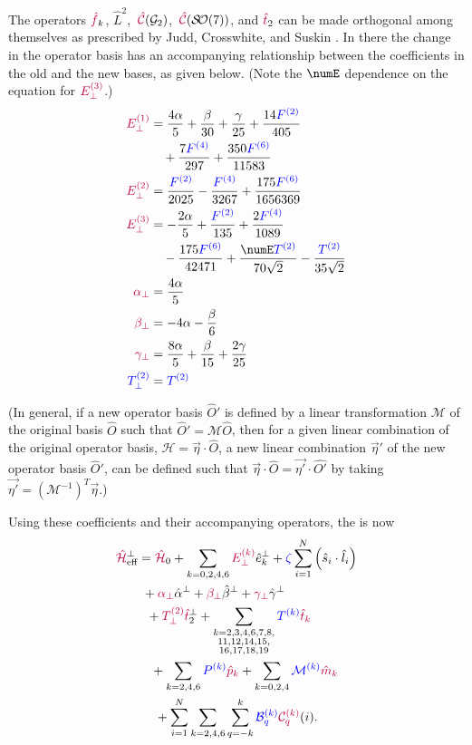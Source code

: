 \documentclass[11pt, twoside,openright]{article}
\begin{document}
The operators $\textcolor{purple}{\hat{f}}_k$, $\hat{L}^2$, ${\,\mathcal{\textcolor{purple}{\hat{C}}}}(\mathcal{G}_2) $, ${\,\mathcal{\textcolor{purple}{\hat{C}}}}(\mathcal{S\!O}(7))$, and $\textcolor{purple}{\hat{t}}_2$ can be made orthogonal among themselves as prescribed by Judd, Crosswhite, and Suskin \cite{judd_orthogonalized_1984,judd_complete_1984}. In there the change in the operator basis has an accompanying relationship between the coefficients in the old and the new bases, as given below. (Note the $\numE$ dependence on the equation for $\textcolor{purple}{{{E}^{(3)}_\perp}}$.) 
\begin{align}
    \OEk{1} &= \frac{4\alpha}{5}+\frac{\beta}{30}+\frac{\gamma}{25}+\frac{14\Fk{2}}{405} \notag \\
    &\quad +\frac{7\Fk{4}}{297} +\frac{350\Fk{6}}{11583} \\
    \OEk{2} &= \frac{\Fk{2}}{2025}-\frac{\Fk{4}}{3267}+\frac{175\Fk{6}}{1656369} \\
    \OEk{3} &= -\frac{2\alpha}{5}+\frac{\Fk{2}}{135}+\frac{2\Fk{4}}{1089} \notag \\
    & \quad -\frac{175\Fk{6}}{42471} +\frac{\numE\Tk{2}}{70\sqrt{2}}-\frac{\Tk{2}}{35\sqrt{2}} \\
    \OcasimirAlpha &= \frac{4\alpha}{5} \\
    \OcasimirBeta &= -4\alpha-\frac{\beta}{6} \\
    \OcasimirGamma &= \frac{8\alpha}{5}+\frac{\beta}{15}+\frac{2\gamma}{25} \\
    \OTk{2} & = \Tk{2} \label{eq: T2 prime}
\end{align}

(In general, if a new operator basis $\hat{O}'$ is defined by a linear transformation $\mathcal{M}$ of the original basis $\hat{O}$ such that $\hat{O}' = \mathcal{M} \hat{O}$, then for a given linear combination of the original operator basis, $\mathcal{H} = \vec{\eta} \cdot \hat{O}$, a new linear combination $\vec{\eta}'$ of the new operator basis $\hat{O}'$, can be defined such that $\vec{\eta} \cdot \hat{O} = \vec{\eta'} \cdot \hat{O'}$ by taking $\vec{\eta'} = \left(\mathcal{M}^{-1}\right)^T \vec{\eta}$.)

Using these coefficients and their accompanying operators, the \hamilton is now
\begin{align}
    \textcolor{purple}{\hat{\mathcal{H}}}_{\text{eff}}^\perp &=  \textcolor{purple}{\hat{\mathcal{H}}}_{0}
     + \sum_{k=0,2,4,6} \textcolor{purple}{{{E}^{(k)}_\perp}} \hat{e}_{k}^\perp
     + \textcolor{blue}{{\zeta}} \sum_{i=1}^N  \left({ \hat{s}_i \cdot \hat{l}_i}\right) \nonumber \\
     &\,\,  + \textcolor{purple}{{\alpha_\perp}} \hat{\alpha}^\perp 
      + \textcolor{purple}{{\beta_\perp}} \hat{\beta}^\perp
       + \textcolor{purple}{{\gamma_\perp}} \hat{\gamma}^\perp \nonumber \\
     &\,\,\,\,  + {\textcolor{purple}{T^{(2)}_\perp}}\textcolor{purple}{\hat{t}}_2^\perp 
      + \sum_{\substack{ k = 2,3,4,6,7,8, \\ 11,12,14,15, \\ 16,17,18,19 } } \textcolor{blue}{T^{(k)}} \textcolor{purple}{\textcolor{purple}{\hat{t}}_{k}} \nonumber \\
     &\,\,\,\,\,\, 
     + \sum_{k=2,4,6} \textcolor{blue}{P^{(k)}} \textcolor{purple}{\textcolor{purple}{\hat{p}_{k}}} + \sum_{k=0,2,4} \textcolor{blue}{\mathcal{M}^{(k)}} \textcolor{purple}{\textcolor{purple}{\hat{m}}_{k}} \nonumber \\
     &\,\,\,\,\,\,\,\,  + \sum_{i=1}^{N} \sum_{k=2,4,6}\sum_{q=-k}^{k} \textcolor{blue}{\mathcal{B}^{(k)}_{q}} \textcolor{purple}{\mathcal{C}^{(k)}_{q}}(i).
    \label{eqn:mostly-orthogonal-hamiltonian}
\end{align}
\end{document}
